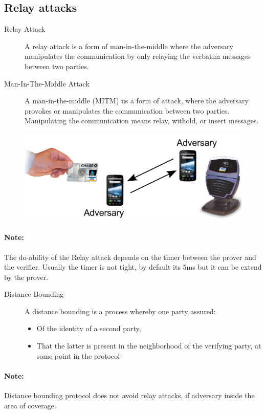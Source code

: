 
\subsection{Relay attacks}
\begin{description}
    \item[Relay Attack] A relay attack is a form of man-in-the-middle where the
    adversary manipulates the communication by only relaying the verbatim
    messages between two parties.
    \item[Man-In-The-Middle Attack] A man-in-the-middle (MITM) us a form of
    attack, where the adversary provokes or manipulates the communication
    between two parties. Manipulating the communication means relay, withold, or
    insert messages.
\end{description}

\begin{figure}[ht!]
    \centering
    \includegraphics{img/relay-attack}
\end{figure}
\paragraph{Note:} The do-ability of the Relay attack depends on the timer
between the prover and the verifier. Usually the timer is not tight, by default
its 5ms but it can be extend by the prover.


\begin{description}
    \item[Distance Bounding] A distance bounding is a process whereby one party
    assured:
    \begin{itemize}
        \item Of the identity of a second party,
        \item That the latter is present in the neighborhood of the verifying
        party, at some point in the protocol
    \end{itemize}
\end{description}
\paragraph{Note:} Distance bounding protocol does not avoid relay attacks, if
adversary inside the area of coverage.

